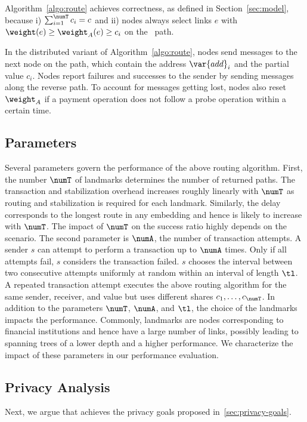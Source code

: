 Algorithm~\ref{algo:route} achieves correctness, as defined in Section~\ref{sec:model}, because i) $\sum_{i=1}^{\numT} c_i = c$ and ii) nodes always select links $e$ with $\weight(e)\geq\weight_A(e)\geq c_i$ on the \ith\ path.   

In the distributed variant of Algorithm~\ref{algo:route}, nodes send messages to the next node on the path, which contain the address $\var{add}_i$ and the partial value $c_i$. Nodes report failures and successes to the sender by sending messages along the reverse path. 
To account for messages getting lost, nodes also reset $\weight_A$ if a payment operation does not follow a probe operation within a certain time. 

\subsection{Parameters}
Several parameters govern the performance of the above routing algorithm. First, the number $\numT$
of landmarks determines the number of returned paths. The transaction and stabilization overhead increases roughly linearly with $\numT$ as routing and stabilization is required for each landmark. Similarly, the delay corresponds to the longest route in any embedding and hence is likely to increase with $\numT$. 
The impact of $\numT$ on the success ratio highly depends on the scenario. 
The second parameter is $\numA$, the number of transaction attempts. 
A sender $s$ can attempt to perform a transaction up to $\numA$ times.
Only if all attempts fail, $s$ considers the transaction failed. 
$s$ chooses the interval between two consecutive attempts uniformly at random within an interval of length $\tl$.
A repeated transaction attempt executes the above routing algorithm for the same sender, receiver, and value but uses different shares $c_1, \ldots , c_{\numT}$. 
In addition to the parameters $\numT$, $\numA$, and $\tl$, the choice of the landmarks impacts the performance.
Commonly, landmarks are nodes corresponding to financial institutions and hence have a large number of links, possibly leading to spanning trees of a lower depth and a higher performance. 
We characterize the impact of these parameters in our performance evaluation.  

   
\subsection{Privacy Analysis}
\label{sec:privacy}

Next, we argue that \oursys achieves the privacy goals 
proposed in~\cref{sec:privacy-goals}. 

